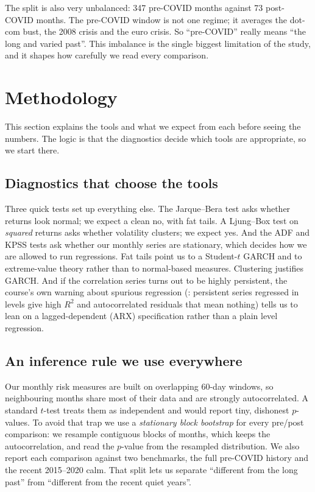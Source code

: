 \documentclass[11pt,a4paper]{article}
\begin{document}
The split is also very unbalanced: 347 pre-COVID months against 73 post-COVID months. The pre-COVID
window is not one regime; it averages the dot-com bust, the 2008 crisis and the euro crisis. So
``pre-COVID'' really means ``the long and varied past''. This imbalance is the single biggest limitation
of the study, and it shapes how carefully we read every comparison.

% 
\section{Methodology}
% 

This section explains the tools and what we expect from each before seeing the numbers. The logic is
that the diagnostics decide which tools are appropriate, so we start there.

\subsection{Diagnostics that choose the tools}

Three quick tests set up everything else. The Jarque--Bera test asks whether returns look normal; we
expect a clean no, with fat tails. A Ljung--Box test on \emph{squared} returns asks whether volatility
clusters; we expect yes. And the ADF and KPSS tests ask whether our monthly series are stationary, which
decides how we are allowed to run regressions. Fat tails point us to a Student-$t$ GARCH and to
extreme-value theory rather than to normal-based measures. Clustering justifies GARCH. And if the
correlation series turns out to be highly persistent, the course's own warning about spurious regression
(\citealp{phillips1986}: persistent series regressed in levels give high $R^2$ and autocorrelated
residuals that mean nothing) tells us to lean on a lagged-dependent (ARX) specification rather than a
plain level regression.

\subsection{An inference rule we use everywhere}

Our monthly risk measures are built on overlapping 60-day windows, so neighbouring months share most of
their data and are strongly autocorrelated. A standard $t$-test treats them as independent and would
report tiny, dishonest $p$-values. To avoid that trap we use a \emph{stationary block bootstrap} for
every pre/post comparison: we resample contiguous blocks of months, which keeps the autocorrelation, and
read the $p$-value from the resampled distribution. We also report each comparison against two
benchmarks, the full pre-COVID history and the recent 2015--2020 calm. That split lets us separate
``different from the long past'' from ``different from the recent quiet years''.
\end{document}
